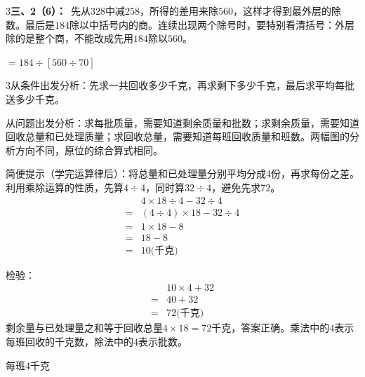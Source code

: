 \documentclass[multi=snippet,border={5bp 20bp 5bp 5bp}]{standalone}
\newenvironment{snippet}[3]{\begin{minipage}{#1bp}\color{answerred}\fontsize{#2}{#3}\selectfont\raggedright}{\end{minipage}}
\begin{document}
\begin{snippet}{505}{11.5}{14}\begin{multicols}{3}\raggedcolumns \textbf{三、2（6）：}\ 先从\(328\)\allowbreak 中减\(258\)\allowbreak ，所得的差用来除\(560\)\allowbreak ，这样才得到最外层的除数。最后是\(184\)\allowbreak 除以中括号内的商。连续出现两个除号时，要特别看清括号：外层除的是整个商，不能改成先用\(184\)\allowbreak 除以\(560\)\allowbreak 。\end{multicols}\end{snippet}
\begin{snippet}{92.06008300781252}{10}{12.8}\SourceSans\setlength{\mathindent}{2bp}\(\displaystyle=184\div[560\div70]\)\end{snippet}
\begin{snippet}{505}{11.5}{14}\begin{multicols}{3}\raggedcolumns 从条件出发分析：先求一共回收多少千克，再求剩下多少千克，最后求平均每批送多少千克。\par 从问题出发分析：求每批质量，需要知道剩余质量和批数；求剩余质量，需要知道回收总量和已处理质量；求回收总量，需要知道每班回收质量和班数。两幅图的分析方向不同，原位的综合算式相同。\par 简便提示（学完运算律后）：将总量和已处理量分别平均分成4份，再求每份之差。利用乘除运算的性质，先算\(4\div4\)\allowbreak ，同时算\(32\div4\)\allowbreak ，避免先求72。\[\begin{aligned}&4\times18\div4-32\div4\\={}&(4\div4)\times18-32\div4\\={}&1\times18-8\\={}&18-8\\={}&10\text{(千克)}\end{aligned}\]\par 检验：\[\begin{aligned}&10\times4+32\\={}&40+32\\={}&72\text{(千克)}\end{aligned}\]剩余量与已处理量之和等于回收总量\(4\times18=72\)\allowbreak 千克，答案正确。乘法中的\(4\)\allowbreak 表示每班回收的千克数，除法中的\(4\)\allowbreak 表示批数。\end{multicols}\end{snippet}
\begin{snippet}{69.80000000000001}{8.5}{12.8}\SourceSans\setlength{\mathindent}{2bp}每班\(4\)千克\end{snippet}
\end{document}
